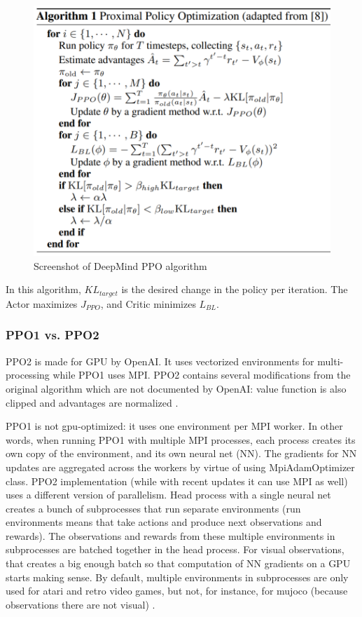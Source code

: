 \documentclass[lang=en,mode=normal,device=normal,color=blue,12pt]{elegantnote}
\DeclareMathOperator*{\1}{\mathbbm{1}}
\begin{document}
\begin{figure}[h!]
  \centering
  \includegraphics[width=0.7\linewidth]{ppo.PNG}
  \caption{Screenshot of DeepMind PPO algorithm}
  \label{fig:ppo}
\end{figure}

In this algorithm, $KL_{target}$ is the desired change in the policy per iteration.
The Actor maximizes $J_{PPO}$, and Critic minimizes $L_{BL}$.

\subsubsection{PPO1 vs. PPO2}

PPO2 is made for GPU by OpenAI. It uses vectorized environments for multi-processing while PPO1 uses MPI. PPO2 contains several modifications from the original algorithm which are not documented by OpenAI: value function is also clipped and advantages are normalized \cite{ppo2stable}.

PPO1 is not gpu-optimized: it uses one environment per MPI worker. In other words, when running PPO1 with multiple MPI processes, each process creates its own copy of the environment, and its own neural net (NN). The gradients for NN updates are aggregated across the workers by virtue of using MpiAdamOptimizer class.
PPO2 implementation (while with recent updates it can use MPI as well) uses a different version of parallelism. Head process with a single neural net creates a bunch of subprocesses that run separate environments (run environments means that take actions and produce next observations and rewards).
The observations and rewards from these multiple environments in subprocesses are batched together in the head process.
For visual observations, that creates a big enough batch so that computation of NN gradients on a GPU starts making sense.
By default, multiple environments in subprocesses are only used for atari and retro video games, but not, for instance, for mujoco (because observations there are not visual) \cite{ppo2vsppo1}.
\end{document}
